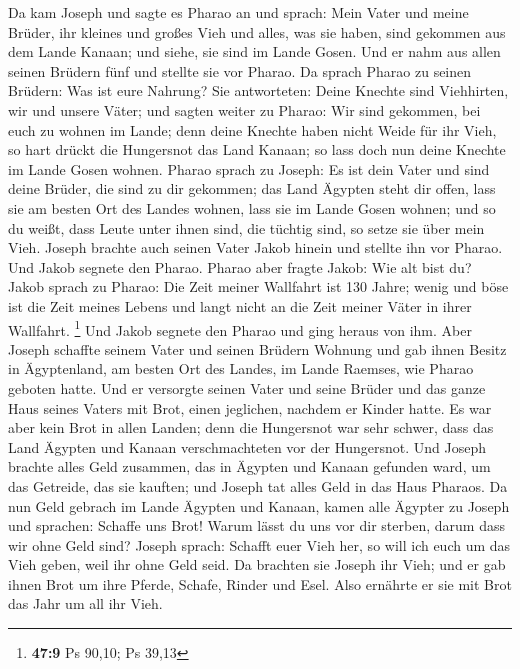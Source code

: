  Da kam Joseph und sagte es Pharao an und sprach: Mein
Vater und meine Brüder, ihr kleines und großes Vieh und alles, was sie
haben, sind gekommen aus dem Lande Kanaan; und siehe, sie sind im Lande
Gosen.  Und er nahm aus allen seinen Brüdern fünf und
stellte sie vor Pharao.  Da sprach Pharao zu seinen
Brüdern: Was ist eure Nahrung? Sie antworteten: Deine Knechte sind
Viehhirten, wir und unsere Väter;  und sagten weiter zu
Pharao: Wir sind gekommen, bei euch zu wohnen im Lande; denn deine
Knechte haben nicht Weide für ihr Vieh, so hart drückt die Hungersnot
das Land Kanaan; so lass doch nun deine Knechte im Lande Gosen wohnen.
 Pharao sprach zu Joseph: Es ist dein Vater und sind deine
Brüder, die sind zu dir gekommen;  das Land Ägypten steht
dir offen, lass sie am besten Ort des Landes wohnen, lass sie im Lande
Gosen wohnen; und so du weißt, dass Leute unter ihnen sind, die tüchtig
sind, so setze sie über mein Vieh.  Joseph brachte auch
seinen Vater Jakob hinein und stellte ihn vor Pharao. Und Jakob segnete
den Pharao.  Pharao aber fragte Jakob: Wie alt bist du?
 Jakob sprach zu Pharao: Die Zeit meiner Wallfahrt ist 130
Jahre; wenig und böse ist die Zeit meines Lebens und langt nicht an die
Zeit meiner Väter in ihrer Wallfahrt. \footnote{\textbf{47:9} Ps 90,10;
  Ps 39,13}  Und Jakob segnete den Pharao und ging heraus
von ihm.  Aber Joseph schaffte seinem Vater und seinen
Brüdern Wohnung und gab ihnen Besitz in Ägyptenland, am besten Ort des
Landes, im Lande Raemses, wie Pharao geboten hatte.  Und
er versorgte seinen Vater und seine Brüder und das ganze Haus seines
Vaters mit Brot, einen jeglichen, nachdem er Kinder hatte.
 Es war aber kein Brot in allen Landen; denn die
Hungersnot war sehr schwer, dass das Land Ägypten und Kanaan
verschmachteten vor der Hungersnot.  Und Joseph brachte
alles Geld zusammen, das in Ägypten und Kanaan gefunden ward, um das
Getreide, das sie kauften; und Joseph tat alles Geld in das Haus
Pharaos.  Da nun Geld gebrach im Lande Ägypten und
Kanaan, kamen alle Ägypter zu Joseph und sprachen: Schaffe uns Brot!
Warum lässt du uns vor dir sterben, darum dass wir ohne Geld sind?
 Joseph sprach: Schafft euer Vieh her, so will ich euch
um das Vieh geben, weil ihr ohne Geld seid.  Da brachten
sie Joseph ihr Vieh; und er gab ihnen Brot um ihre Pferde, Schafe,
Rinder und Esel. Also ernährte er sie mit Brot das Jahr um all ihr Vieh.
